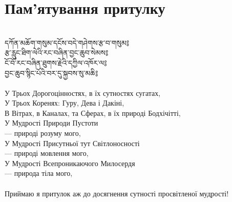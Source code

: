 \newpage
\section{Пам'ятування притулку}
\\
\ti
དཀོན་མཆོག་གསུམ་དངོས་བདེ་གཤེགས་རྩ་བ་གསུམ༔\\
རྩ་རླུང་ཐིག་ལེའི་རང་བཞིན་བྱང་ཆུབ་སེམས༔\\
ངོ་བོ་རང་བཞིན་ཐུགས་རྗེའི་དཀྱིལ་འཁོར་ལ༔\\
བྱང་ཆུབ་སྙིང་པོའི་བར་དུ་སྐྱབས་སུ་མཆི༔\\
\\
\ru
У Трьох Дорогоцінностях, в їх сутностях сугатах,\\
У Трьох Коренях: Гуру, Дева і Дакіні,\\
В Вітрах, в Каналах, та Сферах, в їх природі Бодхічітті,\\
У Мудрості Природи Пустоти \\
\indent --- природі розуму мого,\\
У Мудрості Присутньої тут Світлоносності \\
\indent --- природі мовлення мого,\\
У Мудрості Всепроникаючого Милосердя \\
\indent --- природа тіла мого,\\
\\
Приймаю я притулок аж до досягнення сутності просвітленої мудрості!
